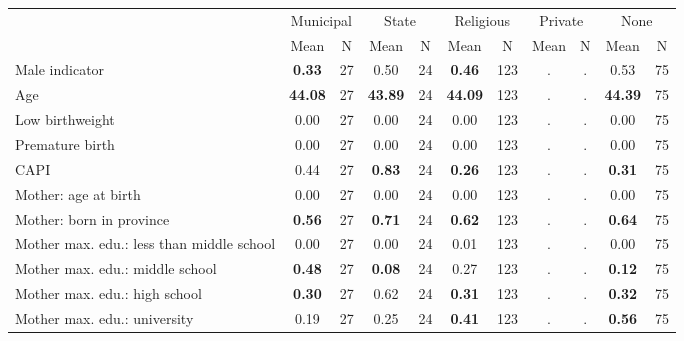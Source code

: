 \begin{tabular}{l c c c c c c c c c c}
\toprule
& \multicolumn{2}{c}{Municipal} & \multicolumn{2}{c}{State} & \multicolumn{2}{c}{Religious} & \multicolumn{2}{c}{Private} & \multicolumn{2}{c}{None} \\
& \scriptsize Mean & \scriptsize N & \scriptsize Mean & \scriptsize N & \scriptsize Mean & \scriptsize N & \scriptsize Mean & \scriptsize N & \scriptsize Mean & \scriptsize N \\
\midrule
Male indicator & \textbf{     0.33} &        27 &      0.50 &        24 & \textbf{     0.46} &       123 &         . & . &      0.53 &        75 \\
Age & \textbf{    44.08} &        27 & \textbf{    43.89} &        24 & \textbf{    44.09} &       123 &         . & . & \textbf{    44.39} &        75 \\
Low birthweight &      0.00 &        27 &      0.00 &        24 &      0.00 &       123 &         . & . &      0.00 &        75 \\
Premature birth &      0.00 &        27 &      0.00 &        24 &      0.00 &       123 &         . & . &      0.00 &        75 \\
CAPI &      0.44 &        27 & \textbf{     0.83} &        24 & \textbf{     0.26} &       123 &         . & . & \textbf{     0.31} &        75 \\
Mother: age at birth &      0.00 &        27 &      0.00 &        24 &      0.00 &       123 &         . & . &      0.00 &        75 \\
Mother: born in province & \textbf{     0.56} &        27 & \textbf{     0.71} &        24 & \textbf{     0.62} &       123 &         . & . & \textbf{     0.64} &        75 \\
Mother max. edu.: less than middle school &      0.00 &        27 &      0.00 &        24 &      0.01 &       123 &         . & . &      0.00 &        75 \\
Mother max. edu.: middle school & \textbf{     0.48} &        27 & \textbf{     0.08} &        24 &      0.27 &       123 &         . & . & \textbf{     0.12} &        75 \\
Mother max. edu.: high school & \textbf{     0.30} &        27 &      0.62 &        24 & \textbf{     0.31} &       123 &         . & . & \textbf{     0.32} &        75 \\
Mother max. edu.: university &      0.19 &        27 &      0.25 &        24 & \textbf{     0.41} &       123 &         . & . & \textbf{     0.56} &        75 \\

\end{tabular}
